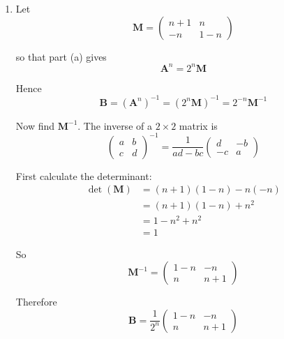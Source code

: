 \documentclass[leqno]{article}
\begin{document}
\begin{enumerate}[
  label=\textbf{\arabic*.},
  leftmargin=*,
  topsep=0pt,
  partopsep=0pt,
  parsep=0pt
]
\begin{djsSolution}
\begin{enumerate}[label=\textbf{(\alph*)}]
This is exactly the required form, so the statement is true for $n=k+1$.

\textbf{Conclusion:} If the statement is true for $n=k$, then it is true for $n=k+1$. Since it is true for $n=1$, by the principle of mathematical induction the statement is true for all positive integers $n$.

  \item Let
\[
\mathbf{M}=\begin{pmatrix}n+1&n\\-n&1-n\end{pmatrix}
\]

so that part (a) gives
\[
\mathbf{A}^n=2^n\mathbf{M}
\]

Hence
\[
\mathbf{B}=(\mathbf{A}^n)^{-1}=(2^n\mathbf{M})^{-1}=2^{-n}\mathbf{M}^{-1}
\]

Now find $\mathbf{M}^{-1}$. The inverse of a $2\times2$ matrix is
\[
\begin{pmatrix}a&b\\c&d\end{pmatrix}^{-1}
=\frac{1}{ad-bc}\begin{pmatrix}d&-b\\-c&a\end{pmatrix}
\]

First calculate the determinant:
\begin{align*}
\det(\mathbf{M})
&=(n+1)(1-n)-n(-n) \\
&=(n+1)(1-n)+n^2 \\
&=1-n^2+n^2 \\
&=1
\end{align*}

So
\[
\mathbf{M}^{-1}=\begin{pmatrix}1-n&-n\\n&n+1\end{pmatrix}
\]

Therefore
\[
\mathbf{B}=\frac{1}{2^n}\begin{pmatrix}1-n&-n\\n&n+1\end{pmatrix}
\]

  \end{enumerate}
\end{djsSolution}


\newpage

\questionitem


\end{enumerate}
\end{document}

